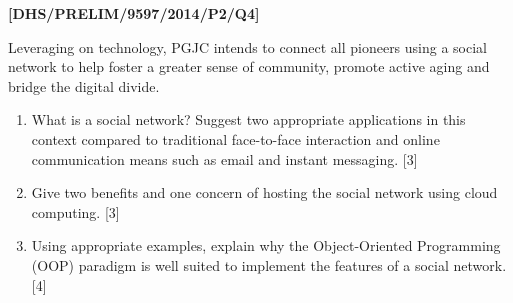 \item \textbf{{[}DHS/PRELIM/9597/2014/P2/Q4{]} }

Leveraging on technology, PGJC intends to connect all pioneers using
a social network to help foster a greater sense of community, promote
active aging and bridge the digital divide. 
\begin{enumerate}
\item What is a social network? Suggest two appropriate applications in
this context compared to traditional face-to-face interaction and
online communication means such as email and instant messaging.\hfill{}
{[}3{]} 
\item Give two benefits and one concern of hosting the social network using
cloud computing.\hfill{} {[}3{]}
\item Using appropriate examples, explain why the Object-Oriented Programming
(OOP) paradigm is well suited to implement the features of a social
network. \hfill{}{[}4{]}
\end{enumerate}